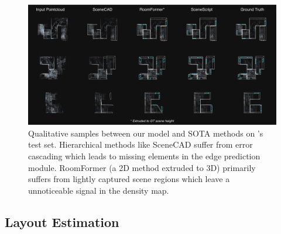 \begin{figure}[t]
    \centering
    \includegraphics[width=\linewidth]{figs/layout_qualitative.jpg}
    \caption{Qualitative samples between our model and SOTA methods on \DatasetName's test set. Hierarchical methods like SceneCAD suffer from error cascading which leads to missing elements in the edge prediction module. RoomFormer (a 2D method extruded to 3D) primarily suffers from lightly captured scene regions which leave a unnoticeable signal in the density map. }
    \label{fig:qualitative_layout}
\end{figure}

\subsection{Layout Estimation}


